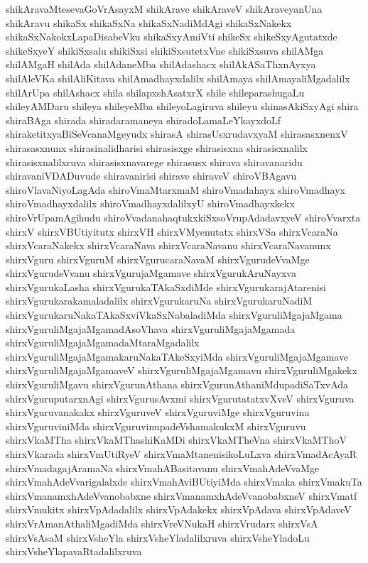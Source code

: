 {shikAravaMtesevaGoVrAsayxM
shikArave
shikAraveV
shikAraveyanUna
shikAravu
shikaSx
shikaSxNa
shikaSxNadiMdAgi
shikaSxNakekx
shikaSxNakokxLapaDisabeVku
shikaSxyAmiVti
shikeSx
shikeSxyAgutatxde
shikeSxyeY
shikiSxsalu
shikiSxsi
shikiSxsutetxVne
shikiSxsuva
shilAMga
shilAMgaH
shilAda
shilAdaneMba
shilAdashacx
shilAkASaThxnAyxya
shilAleVKa
shilAliKitava
shilAmadhayxdalilx
shilAmaya
shilAmayaliMgadalilx
shilArUpa
shilAshacx
shila
shilapxshAsatxrX
shile
shileparashugaLu
shileyAMDaru
shileya
shileyeMba
shileyoLagiruva
shileyu
shinasAkiSxyAgi
shira
shiraBAga
shirada
shiradaramaneya
shiradoLamaLeYkayxdoLf
shiraketitxyaBiSeVcanaMgeyudx
shirasA
shirasUsxrudavxyaM
shirasasxnenxV
shirasasxnunx
shirasinalidharisi
shirasisxge
shirasisxna
shirasisxnalilx
shirasisxnalilxruva
shirasisxnavarege
shirasusx
shirava
shiravanaridu
shiravaniVDADuvude
shiravanirisi
shirave
shiraveV
shiroVBAgavu
shiroVlavaNiyoLagAda
shiroVmaMtarxmaM
shiroVmadahayx
shiroVmadhayx
shiroVmadhayxdalilx
shiroVmadhayxdalilxyU
shiroVmadhayxkekx
shiroVrUpamAgihudu
shiroVvadanahaqtukxkiSxsoVrupAdadavxyeV
shiroVvarxta
shirxV
shirxVBUtiyitutx
shirxVH
shirxVMyenutatx
shirxVSa
shirxVcaraNa
shirxVcaraNakekx
shirxVcaraNava
shirxVcaraNavanu
shirxVcaraNavanunx
shirxVguru
shirxVguruM
shirxVgurucaraNavaM
shirxVgurudeVvaMge
shirxVgurudeVvanu
shirxVgurujaMgamave
shirxVgurukAruNayxva
shirxVgurukaLasha
shirxVgurukaTAkaSxdiMde
shirxVgurukarajAtarenisi
shirxVgurukarakamaladalilx
shirxVgurukaruNa
shirxVgurukaruNadiM
shirxVgurukaruNakaTAkaSxviVkaSxNabaladiMda
shirxVguruliMgajaMgama
shirxVguruliMgajaMgamadAsoVhava
shirxVguruliMgajaMgamada
shirxVguruliMgajaMgamadaMtaraMgadalilx
shirxVguruliMgajaMgamakaruNakaTAkeSxyiMda
shirxVguruliMgajaMgamave
shirxVguruliMgajaMgamaveV
shirxVguruliMgajaMgamavu
shirxVguruliMgakekx
shirxVguruliMgavu
shirxVgurunAthana
shirxVgurunAthaniMdupadiSaTxvAda
shirxVguruputarxnAgi
shirxVgurusAvxmi
shirxVgurutatatxvXveV
shirxVguruva
shirxVguruvanakakx
shirxVguruveV
shirxVguruviMge
shirxVguruvina
shirxVguruviniMda
shirxVguruvinupadeVshamakukxM
shirxVguruvu
shirxVkaMTha
shirxVkaMThashiKaMDi
shirxVkaMTheVna
shirxVkaMThoV
shirxVkarada
shirxVmUtiRyeV
shirxVmaMtanenisikoLuLxva
shirxVmadAcAyaR
shirxVmadagajAramaNa
shirxVmahABasitavanu
shirxVmahAdeVvaMge
shirxVmahAdeVvarigalalxde
shirxVmahAviBUtiyiMda
shirxVmaka
shirxVmakuTa
shirxVmanamxhAdeVvanobabxne
shirxVmanamxhAdeVvanobabxneV
shirxVmatf
shirxVmukitx
shirxVpAdadalilx
shirxVpAdakekx
shirxVpAdava
shirxVpAdaveV
shirxVrAmanAthaliMgadiMda
shirxVreVNukaH
shirxVrudarx
shirxVsA
shirxVsAsaM
shirxVsheYla
shirxVsheYladalilxruva
shirxVsheYladoLu
shirxVsheYlapavaRtadalilxruva
}
